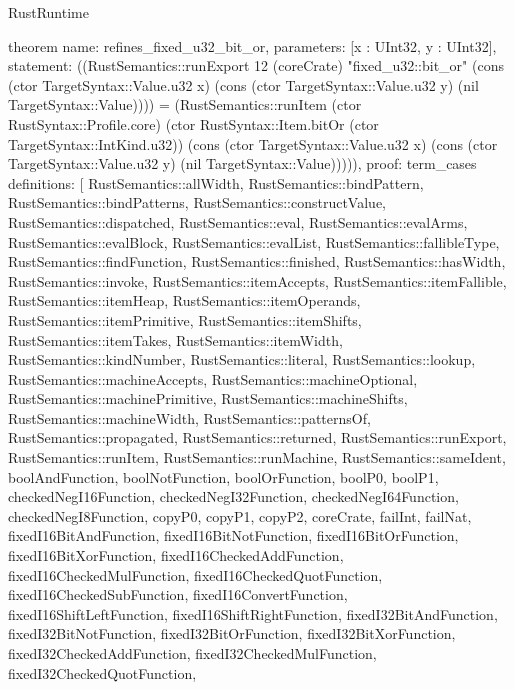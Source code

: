 \begin{lexlean}{RustRuntime}
\begin{semanticmodule}
theorem{
  name: refines_fixed_u32_bit_or,
  parameters: [x : UInt32, y : UInt32],
  statement: ((RustSemantics::runExport 12 (coreCrate) "fixed_u32::bit_or" (cons (ctor TargetSyntax::Value.u32 x) (cons (ctor TargetSyntax::Value.u32 y) (nil TargetSyntax::Value)))) = (RustSemantics::runItem (ctor RustSyntax::Profile.core) (ctor RustSyntax::Item.bitOr (ctor TargetSyntax::IntKind.u32)) (cons (ctor TargetSyntax::Value.u32 x) (cons (ctor TargetSyntax::Value.u32 y) (nil TargetSyntax::Value))))),
  proof: term_cases{
    definitions: [
      RustSemantics::allWidth,
      RustSemantics::bindPattern,
      RustSemantics::bindPatterns,
      RustSemantics::constructValue,
      RustSemantics::dispatched,
      RustSemantics::eval,
      RustSemantics::evalArms,
      RustSemantics::evalBlock,
      RustSemantics::evalList,
      RustSemantics::fallibleType,
      RustSemantics::findFunction,
      RustSemantics::finished,
      RustSemantics::hasWidth,
      RustSemantics::invoke,
      RustSemantics::itemAccepts,
      RustSemantics::itemFallible,
      RustSemantics::itemHeap,
      RustSemantics::itemOperands,
      RustSemantics::itemPrimitive,
      RustSemantics::itemShifts,
      RustSemantics::itemTakes,
      RustSemantics::itemWidth,
      RustSemantics::kindNumber,
      RustSemantics::literal,
      RustSemantics::lookup,
      RustSemantics::machineAccepts,
      RustSemantics::machineOptional,
      RustSemantics::machinePrimitive,
      RustSemantics::machineShifts,
      RustSemantics::machineWidth,
      RustSemantics::patternsOf,
      RustSemantics::propagated,
      RustSemantics::returned,
      RustSemantics::runExport,
      RustSemantics::runItem,
      RustSemantics::runMachine,
      RustSemantics::sameIdent,
      boolAndFunction,
      boolNotFunction,
      boolOrFunction,
      boolP0,
      boolP1,
      checkedNegI16Function,
      checkedNegI32Function,
      checkedNegI64Function,
      checkedNegI8Function,
      copyP0,
      copyP1,
      copyP2,
      coreCrate,
      failInt,
      failNat,
      fixedI16BitAndFunction,
      fixedI16BitNotFunction,
      fixedI16BitOrFunction,
      fixedI16BitXorFunction,
      fixedI16CheckedAddFunction,
      fixedI16CheckedMulFunction,
      fixedI16CheckedQuotFunction,
      fixedI16CheckedSubFunction,
      fixedI16ConvertFunction,
      fixedI16ShiftLeftFunction,
      fixedI16ShiftRightFunction,
      fixedI32BitAndFunction,
      fixedI32BitNotFunction,
      fixedI32BitOrFunction,
      fixedI32BitXorFunction,
      fixedI32CheckedAddFunction,
      fixedI32CheckedMulFunction,
      fixedI32CheckedQuotFunction,
}}
\end{semanticmodule}
\end{lexlean}
